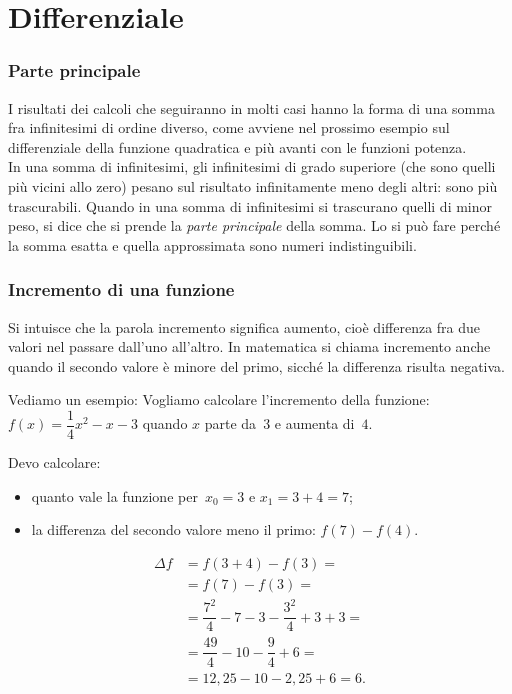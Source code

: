 \section{Differenziale}
\label{sec:diff01_differenziale}

\subsubsection{Parte principale}
\label{subsubsec:diff01_parteprincipale}
I risultati dei calcoli che seguiranno in molti casi hanno la forma di una 
somma fra infinitesimi di ordine diverso, come avviene nel prossimo esempio 
sul differenziale della funzione quadratica e più avanti con le funzioni 
potenza.\\
In una somma di infinitesimi, gli infinitesimi di
grado superiore (che sono quelli più vicini allo zero) pesano 
sul risultato infinitamente meno degli altri: sono più trascurabili.
Quando in una somma di infinitesimi si trascurano quelli di minor peso,
si dice che si prende la \emph{parte principale} della somma.
Lo si può fare perché la somma esatta e quella approssimata sono 
numeri indistinguibili.

\subsubsection{Incremento di una funzione}
\label{subsubsec:diff01_incremento}
    

Si intuisce che la parola incremento significa aumento, cioè differenza fra due 
valori nel passare dall'uno all'altro. In matematica si chiama incremento anche 
quando il secondo valore è minore del primo, sicché la differenza risulta 
negativa.

\begin{minipage}{.48 \textwidth}
Vediamo un esempio: 
Vogliamo calcolare l'incremento della 
funzione:~\(f(x) = \dfrac{1}{4} x^2 -x -3\)
quando \(x\) parte da~\(3\) e aumenta di~\(4\).

Devo calcolare:
\begin {itemize}[nosep, noitemsep]
 \item quanto vale la funzione per~$x_0=3$ e $x_1=3+4=7$;
 \item la differenza del secondo valore meno il primo: $f(7)-f(4)$.
\end {itemize}
 
\begin{align*}
 \Delta f &= f(3+4) - f(3) = \\
        &= f(7) - f(3) = \\
        &= \dfrac{7^2}{4}  -7 -3 - \dfrac{3^2}{4}  +3 +3 =\\
        &= \dfrac{49}{4} -10 - \dfrac{9}{4} +6 =\\
        &= 12,25 -10 - 2,25 +6 = 6.
\end{align*}

\[\]
\end{minipage}
 \hfill
\begin{minipage}{.48 \textwidth}
 \begin{center}
\incremento
 \end{center}
\end{minipage}

